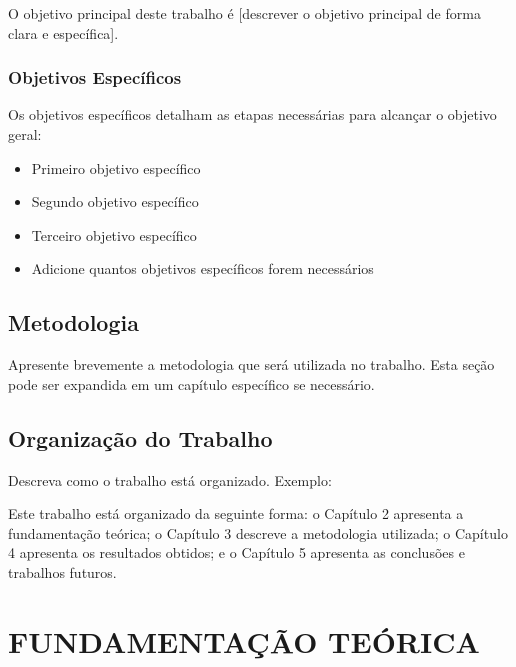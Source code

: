 \documentclass[12pt, a4paper, brazil, oneside]{abntex2}
\begin{document}
O objetivo principal deste trabalho é [descrever o objetivo principal de forma clara e específica].

\subsection{Objetivos Específicos}

Os objetivos específicos detalham as etapas necessárias para alcançar o objetivo geral:

\begin{itemize}
    \item Primeiro objetivo específico
    \item Segundo objetivo específico  
    \item Terceiro objetivo específico
    \item Adicione quantos objetivos específicos forem necessários
\end{itemize}

\section{Metodologia}

Apresente brevemente a metodologia que será utilizada no trabalho. Esta seção pode ser expandida em um capítulo específico se necessário.

\section{Organização do Trabalho}

Descreva como o trabalho está organizado. Exemplo:

Este trabalho está organizado da seguinte forma: o Capítulo 2 apresenta a fundamentação teórica; o Capítulo 3 descreve a metodologia utilizada; o Capítulo 4 apresenta os resultados obtidos; e o Capítulo 5 apresenta as conclusões e trabalhos futuros.


\chapter{FUNDAMENTAÇÃO TEÓRICA}

\end{document}
